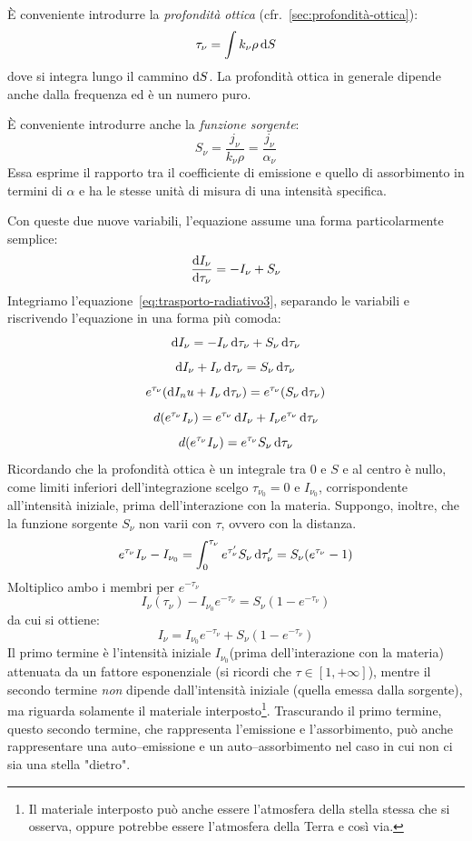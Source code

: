 È conveniente introdurre la \emph{profondità ottica} (cfr.~\ref{sec:profondità-ottica}):
\begin{equation}\label{eq:profondità-ottica}
        \tau_\nu = \int k_\nu \rho \mathop{\mathrm{{}d}}\mathopen{} S
\end{equation}
dove si integra lungo il cammino $\mathop{\mathrm{{}d}}\mathopen{} S$. La profondità ottica in generale dipende anche dalla frequenza ed è un numero puro. 

È conveniente introdurre anche la \emph{funzione sorgente}:
\begin{equation}\label{eq:funzione-sorgente}
    S_\nu = \frac{j_\nu}{k_\nu \rho} = \frac{j_\nu}{\alpha_\nu}
\end{equation}
Essa esprime il rapporto tra il coefficiente di emissione e quello di assorbimento in termini di $\alpha$ e ha le stesse unità di misura di una intensità specifica.

Con queste due nuove variabili, l'equazione assume una forma particolarmente semplice:
\begin{equation}\label{eq:trasporto-radiativo3}
    \frac{\mathop{\mathrm{{}d}}\mathopen{} I_\nu}{\mathop{\mathrm{{}d}}\mathopen{} \tau_\nu} = -I_\nu + S_\nu
\end{equation}
Integriamo l'equazione~\eqref{eq:trasporto-radiativo3}, separando le variabili e riscrivendo l'equazione in una forma più comoda:
\[
    \mathop{\mathrm{{}d}}\mathopen{} I_\nu = -I_\nu \mathop{\mathrm{{}d}}\mathopen{} \tau_\nu  + S_\nu \mathop{\mathrm{{}d}}\mathopen{} \tau_\nu
\]
\[
    \mathop{\mathrm{{}d}}\mathopen{} I_\nu + I_\nu \mathop{\mathrm{{}d}}\mathopen{} \tau_\nu  = S_\nu \mathop{\mathrm{{}d}}\mathopen{} \tau_\nu
\]
\[
    e^{\tau_\nu} (\mathop{\mathrm{{}d}}\mathopen{} I_nu + I_\nu \mathop{\mathrm{{}d}}\mathopen{} \tau_\nu)  = e^{\tau_\nu} (S_\nu \mathop{\mathrm{{}d}}\mathopen{} \tau_\nu)
\]
\[
    d(e^{\tau_\nu} I_\nu) = e^{\tau_\nu} \mathop{\mathrm{{}d}}\mathopen{} I_\nu + I_\nu e^{\tau_\nu} \mathop{\mathrm{{}d}}\mathopen{} \tau_\nu
\]
\[
    d(e^{\tau_\nu} I_\nu) = e^{\tau_\nu} S_\nu \mathop{\mathrm{{}d}}\mathopen{} \tau_\nu
\]
Ricordando che la profondità ottica è un integrale tra $0$ e $S$ e al centro è nullo, come limiti inferiori dell'integrazione scelgo $\tau_{\nu_0} = 0$ e $I_{\nu_0}$, corrispondente all'intensità iniziale, prima dell'interazione con la materia. Suppongo, inoltre, che la funzione sorgente $S_\nu$ non varii con $\tau$, ovvero con la distanza.
\[
    e^{\tau_\nu} I_\nu - I_{\nu_0} = \int_0^{\tau_\nu} e^{\tau_\nu'} S_\nu \mathop{\mathrm{{}d}}\mathopen{} \tau_\nu' = S_\nu (e^{\tau_\nu} - 1)
\]
Moltiplico ambo i membri per $e^{-\tau_\nu}$
\[
    I_\nu (\tau_\nu) - I_{\nu_0} e^{-\tau_\nu} = S_\nu (1-e^{-\tau_\nu})
\]
da cui si ottiene:
\begin{equation}\label{eq:soluzione-trasporto-radiativo}
    I_\nu = I_{\nu_0} e^{-\tau_\nu} + S_\nu (1- e^{-\tau_\nu})
\end{equation}
Il primo termine è l'intensità iniziale $I_{\nu_0}$(prima dell'interazione con la materia) attenuata da un fattore esponenziale (si ricordi che $\tau \in [1,+\infty]$), mentre il secondo termine \emph{non} dipende dall'intensità iniziale (quella emessa dalla sorgente), ma riguarda solamente il materiale interposto\footnote{Il materiale interposto può anche essere l'atmosfera della stella stessa che si osserva, oppure potrebbe essere l'atmosfera della Terra e così via.}. Trascurando il primo termine, questo secondo termine, che rappresenta l'emissione e l'assorbimento, può anche rappresentare una auto--emissione e un auto--assorbimento nel caso in cui non ci sia una stella "dietro".

